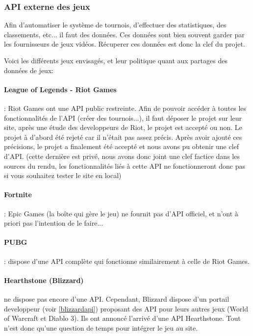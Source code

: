 \documentclass[10pt]{article}
\begin{document}
      \subsubsection{API externe des jeux}
	Afin d'automatiser le système de tournois, d'effectuer des statistiques, des classements, etc... il faut des données.
	Ces données sont bien souvent garder par les fournisseurs de jeux vidéos.
	Récuperer ces données est donc la clef du projet.
	
	Voici les différents jeux envisagés, et leur politique quant aux partages des données de jeux:
	
	\paragraph{League of Legends - Riot Games} : Riot Games ont une API public restreinte.
	Afin de pouvoir accéder à toutes les fonctionnalités de l'API (créer des tournois...),
	il faut déposer le projet sur leur site, après une étude des developpeurs de Riot, le projet est accepté ou non.
	Le projet à d'abord été rejeté car il n'était pas assez précis.
	Après avoir ajouté ces précisions, le projet a finalement été accepté et nous avons pu obtenir une clef d'API.
	(cette dernière est privé, nous avons donc joint une clef factice dans les sources du rendu, les fonctionnalités liés à cette API ne fonctionneront donc pas si vous souhaitez tester le site en local)
	
	\paragraph{Fortnite} : Epic Games (la boîte qui gère le jeu) ne fournit pas d'API officiel, et n'ont à priori pas l'intention de le faire...
	
	\paragraph{PUBG} : dispose d'une API complète qui fonctionne similairement à celle de Riot Games.
	
	\paragraph{Hearthstone (Blizzard)} ne dispose pas encore d'une API.
	Cependant, Blizzard dispose d'un portail developpeur (voir \ref{blizzardapi}) proposant des API pour leurs autres jeux (World of Warcraft et Diablo 3).
	Ils ont annoncé l'arrivé d'une API Hearthstone. Tout n'est donc qu'une question de temps pour intégrer le jeu au site.
\end{document}
